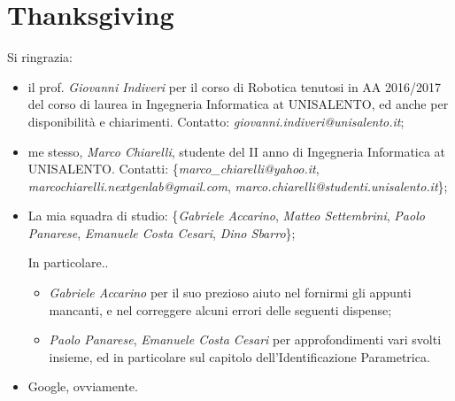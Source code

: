 \documentclass[11 pt,a4paper,twoside,openany]{book}
\begin{document}






\backmatter



%

\newpage

\section*{Thanksgiving}

Si ringrazia:

\begin{itemize}

\item il prof. \emph{Giovanni Indiveri} per il corso di Robotica tenutosi in AA 2016/2017 del corso di laurea in Ingegneria Informatica at UNISALENTO, ed anche per disponibilità e chiarimenti. Contatto: \emph{giovanni.indiveri@unisalento.it};

\item me stesso, \emph{Marco Chiarelli}, studente del II anno di Ingegneria Informatica at UNISALENTO. Contatti: \{\emph{marco\_chiarelli@yahoo.it}, \emph{marcochiarelli.nextgenlab@gmail.com}, \emph{marco.chiarelli@studenti.unisalento.it}\};

\item La mia squadra di studio: \{\emph{Gabriele Accarino}, \emph{Matteo Settembrini}, \emph{Paolo Panarese}, \emph{Emanuele Costa Cesari}, \emph{Dino Sbarro}\};

In particolare..

\begin{itemize}

\item \emph{Gabriele Accarino} per il suo prezioso aiuto nel fornirmi gli appunti mancanti, e nel correggere alcuni errori delle seguenti dispense;
\item \emph{Paolo Panarese}, \emph{Emanuele Costa Cesari} per approfondimenti vari svolti insieme, ed in particolare sul capitolo dell'Identificazione Parametrica.

\end{itemize}

\item Google, ovviamente.

\end{itemize}
\end{document}
